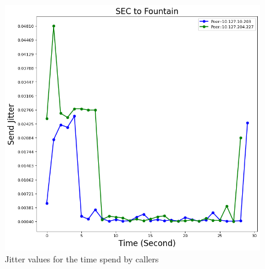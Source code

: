 	\begin{figure}[!t]
		\begin{minipage}{\textwidth}
			\includegraphics[scale=0.38]{Images/experiment/senarios/df_fountain.png}
		\end{minipage}
		\caption{Jitter values for the time spend by callers}
		\label{fig:scene-out-4}
	\end{figure}


